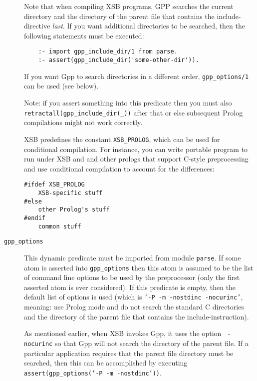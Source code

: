 \begin{description}
  Note that when compiling XSB programs, GPP searches the current directory
  and the directory of the parent file that contains the include-directive
  \emph{last}. If you want additional directories to be searched, then the
  following statements must be executed:
\begin{verbatim}
    :- import gpp_include_dir/1 from parse.
    :- assert(gpp_include_dir('some-other-dir')).
\end{verbatim}
  If you want Gpp to search directories in a different order,
  {\tt gpp\_options/1} can be used (see below).

   Note: if you assert something into this predicate then you must also {\tt
    retractall(gpp\_include\_dir(\_))} after that or else subsequent Prolog
  compilations might not work correctly.

  XSB predefines the constant {\tt XSB\_PROLOG}, which can be used for
  conditional compilation. For instance, you can write portable program
  to run under XSB and and other prologs that support C-style
  preprocessing and use conditional compilation to account for the
  differences: 
  \begin{samepage}
  \begin{verbatim}
#ifdef XSB_PROLOG
    XSB-specific stuff
#else
    other Prolog's stuff
#endif
    common stuff
  \end{verbatim}
  \end{samepage}

\item[{\tt gpp\_options}]  This dynamic predicate
  must be imported from module {\tt parse}.  If some atom is asserted into
  {\tt gpp\_options} then this atom is assumed to be the list of command
  line options to be used by the preprocessor (only the first asserted atom
  is ever considered). If this predicate is empty, then the default list of
  options is used (which is {\tt '-P -m -nostdinc -nocurinc'}, meaning: use
  Prolog mode and do not search the standard C directories and the
  directory of the parent file that contains the include-instruction).
  
  As mentioned earlier, when XSB invokes Gpp, it uses the option {\tt
    -nocurinc} so that Gpp will not search the directory of the parent file. 
  If a particular application requires that the parent file directory
  must be searched, then this can be accomplished by executing 
  {\tt assert(gpp\_options('-P -m -nostdinc'))}.
  

\end{description}
